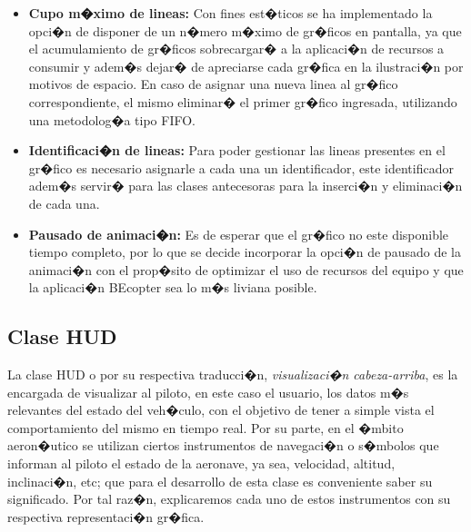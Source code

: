 \begin{itemize}
	\item \textbf{Cupo m�ximo de lineas: } Con fines est�ticos se ha implementado la opci�n de disponer de un n�mero m�ximo de gr�ficos en pantalla, ya que el acumulamiento de gr�ficos sobrecargar� a la aplicaci�n de recursos a consumir y adem�s dejar� de apreciarse cada gr�fica en la ilustraci�n por motivos de espacio. En caso de asignar una nueva linea al gr�fico correspondiente, el mismo eliminar� el primer gr�fico ingresada, utilizando una metodolog�a tipo FIFO.
	\item \textbf{Identificaci�n de lineas: } Para poder gestionar las lineas presentes en el gr�fico es necesario asignarle a cada una un identificador, este identificador adem�s servir� para las clases antecesoras para la inserci�n y eliminaci�n de cada una.
	\item \textbf{Pausado de animaci�n: } Es de esperar que el gr�fico no este disponible tiempo completo, por lo que se decide incorporar la opci�n de pausado de la animaci�n con el prop�sito de optimizar el uso de recursos del equipo y que la aplicaci�n BEcopter sea lo m�s liviana posible.
	
\end{itemize}




\subsection{Clase HUD} %

La clase HUD o por su respectiva traducci�n, \textit{visualizaci�n cabeza-arriba}, es la encargada de visualizar al piloto, en este caso el usuario, los datos m�s relevantes del estado del veh�culo, con el objetivo de tener a simple vista el comportamiento del mismo en tiempo real. Por su parte, en el �mbito aeron�utico se utilizan ciertos instrumentos de navegaci�n o s�mbolos que informan al piloto el estado de la aeronave, ya sea, velocidad, altitud, inclinaci�n, etc; que para el desarrollo de esta clase es conveniente saber su significado. Por tal raz�n, explicaremos cada uno de estos instrumentos con su respectiva representaci�n gr�fica.



